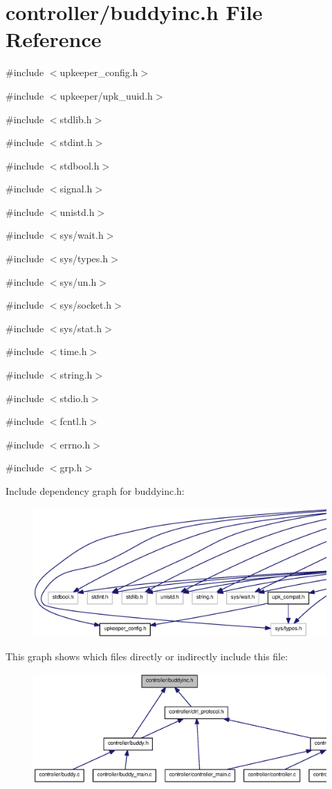 \section{controller/buddyinc.h File Reference}
\label{buddyinc_8h}
{\ttfamily \#include $<$upkeeper\_\-config.h$>$}\par
{\ttfamily \#include $<$upkeeper/upk\_\-uuid.h$>$}\par
{\ttfamily \#include $<$stdlib.h$>$}\par
{\ttfamily \#include $<$stdint.h$>$}\par
{\ttfamily \#include $<$stdbool.h$>$}\par
{\ttfamily \#include $<$signal.h$>$}\par
{\ttfamily \#include $<$unistd.h$>$}\par
{\ttfamily \#include $<$sys/wait.h$>$}\par
{\ttfamily \#include $<$sys/types.h$>$}\par
{\ttfamily \#include $<$sys/un.h$>$}\par
{\ttfamily \#include $<$sys/socket.h$>$}\par
{\ttfamily \#include $<$sys/stat.h$>$}\par
{\ttfamily \#include $<$time.h$>$}\par
{\ttfamily \#include $<$string.h$>$}\par
{\ttfamily \#include $<$stdio.h$>$}\par
{\ttfamily \#include $<$fcntl.h$>$}\par
{\ttfamily \#include $<$errno.h$>$}\par
{\ttfamily \#include $<$grp.h$>$}\par
Include dependency graph for buddyinc.h:\nopagebreak
\begin{figure}[H]
\begin{center}
\leavevmode
\includegraphics[width=400pt]{buddyinc_8h__incl}
\end{center}
\end{figure}
This graph shows which files directly or indirectly include this file:
\nopagebreak
\begin{figure}[H]
\begin{center}
\leavevmode
\includegraphics[width=400pt]{buddyinc_8h__dep__incl}
\end{center}
\end{figure}
